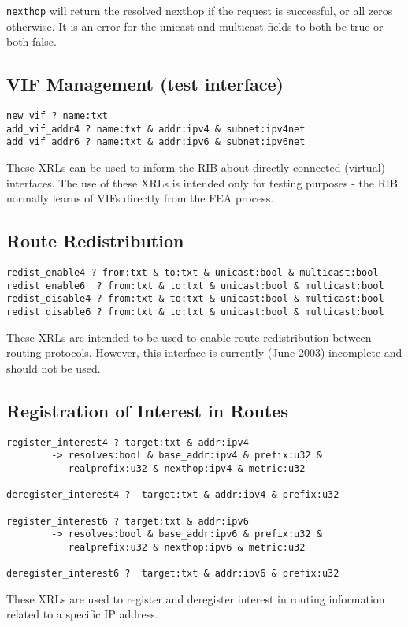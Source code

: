 \documentclass[11pt]{article}
\begin{document}
{\tt nexthop} will return the resolved nexthop if the request is successful,
or all zeros otherwise.  It is an error for the unicast and multicast
fields to both be true or both false.

\subsection{VIF Management (test interface)}
\begin{verbatim}
new_vif ? name:txt
add_vif_addr4 ? name:txt & addr:ipv4 & subnet:ipv4net
add_vif_addr6 ? name:txt & addr:ipv6 & subnet:ipv6net
\end{verbatim}
These XRLs can be used to inform the RIB about directly connected
(virtual) interfaces.  The use of these XRLs is intended only for
testing purposes - the RIB normally learns of VIFs directly from the
FEA process.
 
\subsection{Route Redistribution}
\begin{verbatim}
redist_enable4 ? from:txt & to:txt & unicast:bool & multicast:bool
redist_enable6  ? from:txt & to:txt & unicast:bool & multicast:bool
redist_disable4 ? from:txt & to:txt & unicast:bool & multicast:bool
redist_disable6 ? from:txt & to:txt & unicast:bool & multicast:bool
\end{verbatim}
These XRLs are intended to be used to enable route redistribution
between routing protocols.  However, this interface is currently
(June 2003) incomplete and should not be used.

\subsection{Registration of Interest in Routes}
\label{reg}
\begin{verbatim}
register_interest4 ? target:txt & addr:ipv4 
        -> resolves:bool & base_addr:ipv4 & prefix:u32 & 
           realprefix:u32 & nexthop:ipv4 & metric:u32

deregister_interest4 ?  target:txt & addr:ipv4 & prefix:u32

register_interest6 ? target:txt & addr:ipv6 
        -> resolves:bool & base_addr:ipv6 & prefix:u32 & 
           realprefix:u32 & nexthop:ipv6 & metric:u32

deregister_interest6 ?  target:txt & addr:ipv6 & prefix:u32
\end{verbatim}
These XRLs are used to register and deregister interest in routing
information related to a specific IP address. 
\end{document}
